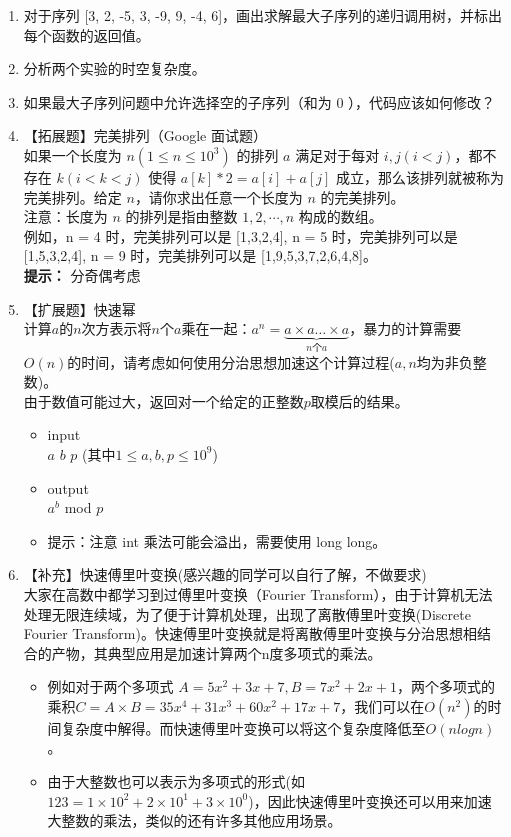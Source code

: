 \documentclass[12pt,a4paper]{article}
\begin{document}
\begin{enumerate}
    \item 对于序列 [3, 2, -5, 3, -9, 9, -4, 6]，画出求解最大子序列的递归调用树，并标出每个函数的返回值。
    \item 分析两个实验的时空复杂度。
    \item 如果最大子序列问题中允许选择空的子序列（和为 0 ），代码应该如何修改？

    \item 【拓展题】完美排列（Google 面试题）\\
          如果一个长度为 $n(1 \le n \le 10^3)$ 的排列 $a$ 满足对于每对 $i, j(i<j)$，都不存在 $k(i < k < j)$ 使得 $a[k]*2 = a[i] + a[j]$ 成立，那么该排列就被称为完美排列。给定 $n$，请你求出任意一个长度为 $n$ 的完美排列。\\
          注意：长度为 $n$ 的排列是指由整数 $1,2,\cdots, n$ 构成的数组。\\
          例如，n = 4 时，完美排列可以是 [1,3,2,4], n = 5 时，完美排列可以是 [1,5,3,2,4], n = 9 时，完美排列可以是 [1,9,5,3,7,2,6,4,8]。\\
          \textbf{提示：} 分奇偶考虑

    \item 【扩展题】快速幂\\
          计算$a$的$n$次方表示将$n$个$a$乘在一起：$a^n=\underbrace{a\times a\dots \times a}_{n\mbox{个}a}$，暴力的计算需要$O(n)$的时间，请考虑如何使用分治思想加速这个计算过程($a,n$均为非负整数)。\\
          由于数值可能过大，返回对一个给定的正整数$p$取模后的结果。
          \begin{itemize}
              \item input \\ $a$ $b$ $p$ (其中$1 \le a, b, p \le 10^9$)
              \item output \\ $a^b$ mod $p$
              \item 提示：注意 int 乘法可能会溢出，需要使用 long long。
          \end{itemize}
    \item 【补充】快速傅里叶变换(感兴趣的同学可以自行了解，不做要求) \\
          大家在高数中都学习到过傅里叶变换（Fourier Transform），由于计算机无法处理无限连续域，为了便于计算机处理，出现了离散傅里叶变换(Discrete Fourier Transform)。快速傅里叶变换就是将离散傅里叶变换与分治思想相结合的产物，其典型应用是加速计算两个n度多项式的乘法。
          \begin{itemize}
              \item 例如对于两个多项式 $A=5x^2+3x+7,B=7x^2+2x+1$，两个多项式的乘积$C=A\times B=35x^4+31x^3+60x^2+17x+7$，我们可以在$O(n^2)$的时间复杂度中解得。而快速傅里叶变换可以将这个复杂度降低至$O(nlogn)$。
              \item 由于大整数也可以表示为多项式的形式(如$123=1\times 10^2+2\times 10^1+3\times 10^0$)，因此快速傅里叶变换还可以用来加速大整数的乘法，类似的还有许多其他应用场景。
          \end{itemize}

\end{enumerate}
\end{document}
